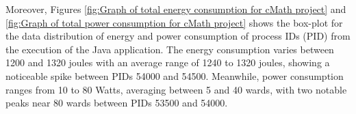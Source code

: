 \vspace{.5em}
Moreover, Figures \ref{fig:Graph of total energy consumption for cMath project} and \ref{fig:Graph of total power consumption for cMath project} shows the box-plot for the data distribution of energy and power consumption 
of process IDs (PID) from the execution of the Java application. The energy consumption varies between 1200 and 1320 joules with an average range of 1240 to 1320 joules, showing a noticeable spike between PIDs 54000 and 54500. Meanwhile, power consumption ranges from 10 to 80 Watts, averaging between 5 and 40 wards, with two notable peaks near 80 wards between PIDs 53500 and 54000. 


